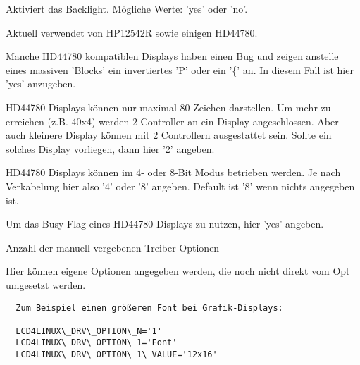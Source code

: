\begin{description}

  Aktiviert das Backlight. Mögliche Werte: 'yes' oder 'no'.

  Aktuell verwendet von HP12542R sowie einigen HD44780.


  Manche HD44780 kompatiblen Displays haben einen Bug und zeigen anstelle eines massiven
  'Blocks' ein invertiertes 'P' oder ein '\{' an.
  In diesem Fall ist hier 'yes' anzugeben.


  HD44780 Displays können nur maximal 80 Zeichen darstellen. Um mehr zu erreichen (z.B. 40x4)
  werden 2 Controller an ein Display angeschlossen. Aber auch kleinere Display können mit 2 Controllern ausgestattet sein.
  Sollte ein solches Display vorliegen, dann hier '2' angeben.


  HD44780 Displays können im 4- oder 8-Bit Modus betrieben werden. Je nach Verkabelung hier also '4' oder '8' angeben.
  Default ist '8' wenn nichts angegeben ist.


  Um das Busy-Flag eines HD44780 Displays zu nutzen, hier 'yes' angeben.


  Anzahl der manuell vergebenen Treiber-Optionen


  Hier können eigene Optionen angegeben werden, die noch nicht direkt vom Opt umgesetzt werden.

\begin{example}
\begin{verbatim}
  Zum Beispiel einen größeren Font bei Grafik-Displays:

  LCD4LINUX\_DRV\_OPTION\_N='1'
  LCD4LINUX\_DRV\_OPTION\_1='Font'
  LCD4LINUX\_DRV\_OPTION\_1\_VALUE='12x16'

\end{verbatim}
\end{example}

\end{description}

